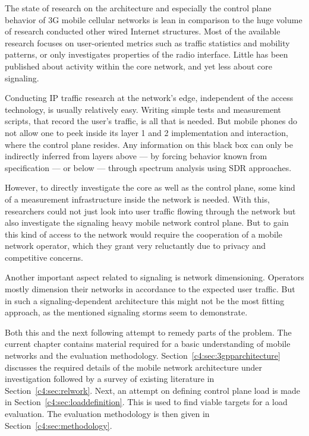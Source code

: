 The state of research on the architecture and especially the control plane behavior of \gls{3G} mobile cellular networks is lean in comparison to the huge volume of research conducted other wired Internet structures. Most of the available research focuses on user-oriented metrics such as traffic statistics and mobility patterns, or only investigates properties of the radio interface. Little has been published about activity within the core network, and yet less about core signaling. 

Conducting \gls{IP} traffic research at the network's edge, independent of the access technology, is usually relatively easy. Writing simple tests and measurement scripts, that record the user's traffic, is all that is needed. But mobile phones do not allow one to peek inside its layer 1 and 2 implementation and interaction, where the control plane resides. Any information on this black box can only be indirectly inferred from layers above --- by forcing behavior known from specification --- or below --- through spectrum analysis using \gls{SDR} approaches. 

However, to directly investigate the core as well as the control plane, some kind of a measurement infrastructure inside the network is needed. With this, researchers could not just look into user traffic flowing through the network but also investigate the signaling heavy mobile network control plane. But to gain this kind of access to the network  would require the cooperation of a mobile network operator, which they grant very reluctantly due to privacy and competitive concerns.

Another important aspect related to signaling is network dimensioning. Operators mostly dimension their networks in accordance to the expected user traffic. But in such a signaling-dependent architecture this might not be the most fitting approach, as the mentioned signaling storms seem to demonstrate. 

Both this and the next following attempt to remedy parts of the problem. The current chapter contains material required for a basic understanding of mobile networks and the evaluation methodology. Section~\ref{c4:sec:3gpparchitecture} discusses the required details of the mobile network architecture under investigation followed by a survey of existing literature in Section~\ref{c4:sec:relwork}. Next, an attempt on defining control plane load is made in Section~\ref{c4:sec:loaddefinition}. This is used to find viable targets for a load evaluation. The evaluation methodology is then given in Section~\ref{c4:sec:methodology}.

